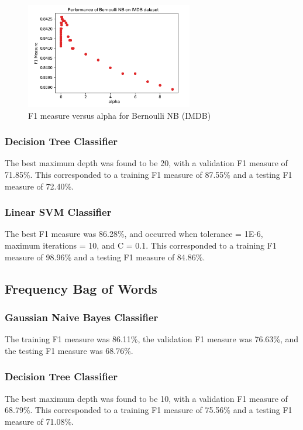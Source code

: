 \documentclass[11pt]{article}
\begin{document}
\begin{figure}[h]
\centering
\includegraphics[width=0.65\textwidth]{IMDB_BernoulliNB}
\caption{F1 measure versus alpha for Bernoulli NB (IMDB)}
\end{figure}

\subsubsection{Decision Tree Classifier}
The best maximum depth was found to be 20, with a validation F1 measure of 71.85\%. This corresponded to a training F1 measure of 87.55\% and a testing F1 measure of 72.40\%.\\

\subsubsection{Linear SVM Classifier}
The best F1 measure was 86.28\%, and occurred when tolerance = 1E-6, maximum iterations = 10, and C = 0.1. This corresponded to a training F1 measure of 98.96\% and a testing F1 measure of 84.86\%.

\subsection{Frequency Bag of Words}
\subsubsection{Gaussian Naive Bayes Classifier}
The training F1 measure was 86.11\%, the validation F1 measure was 76.63\%, and the testing F1 measure was 68.76\%. 

\subsubsection{Decision Tree Classifier}
The best maximum depth was found to be 10, with a validation F1 measure of 68.79\%. This corresponded to a training F1 measure of 75.56\% and a testing F1 measure of 71.08\%.
\end{document}
